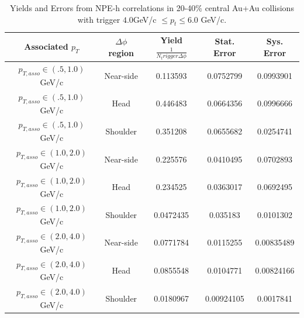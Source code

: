 \begin{table}
\centering
\begin{tabular}{|c|c|c|c|c|}
\hline
Associated $p_T$	& $\Delta\phi$ region & Yield $\frac{1}{N_trigger \Delta\phi}$ & Stat. Error & Sys. Error\\
\hline
$p_{T,asso} \in(.5, 1.0)$ GeV/c  & Near-side & 0.113593 & 0.0752799 & 0.0993901 \\
\hline
$p_{T,asso} \in(.5, 1.0)$ GeV/c  & Head & 0.446483 & 0.0664356 & 0.0996666 \\
\hline
$p_{T,asso} \in(.5, 1.0)$ GeV/c  & Shoulder & 0.351208 & 0.0655682 & 0.0254741 \\
\hline
$p_{T,asso} \in(1.0, 2.0)$ GeV/c  & Near-side & 0.225576 & 0.0410495 & 0.0702893 \\
\hline
$p_{T,asso} \in(1.0, 2.0)$ GeV/c  & Head & 0.234525 & 0.0363017 & 0.0692495 \\
\hline
$p_{T,asso} \in(1.0, 2.0)$ GeV/c  & Shoulder & 0.0472435 & 0.035183 & 0.0101302 \\
\hline
$p_{T,asso} \in(2.0, 4.0)$ GeV/c  & Near-side & 0.0771784 & 0.0115255 & 0.00835489 \\
\hline
$p_{T,asso} \in(2.0, 4.0)$ GeV/c  & Head & 0.0855548 & 0.0104771 & 0.00824166 \\
\hline
$p_{T,asso} \in(2.0, 4.0)$ GeV/c  & Shoulder & 0.0180967 & 0.00924105 & 0.0017841 \\
\hline
\end{tabular}
\caption[Yields and Errors in Au+Au Correlations, 20-40\%, Low Trigger]{Yields and Errors from NPE-h correlations in 20-40\% central Au+Au collisions with trigger $4.0 $GeV/c $\leq p_t \leq 6.0$ GeV/c.}
\label{tab:AuAuYieldMidLow}
\end{table} 

